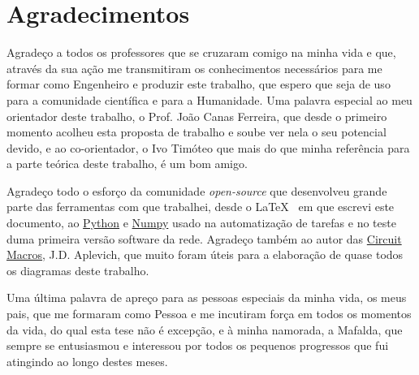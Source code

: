 \chapter*{Agradecimentos}

Agradeço a todos os professores que se cruzaram comigo na minha vida e que, através da sua ação
me transmitiram os conhecimentos necessários para me formar como Engenheiro e produzir este trabalho,
que espero que seja de uso para a comunidade científica e para a Humanidade. Uma palavra especial
ao meu orientador deste trabalho, o Prof. João Canas Ferreira, que desde o primeiro momento acolheu
esta proposta de trabalho e soube ver nela o seu potencial devido, e ao co-orientador, o Ivo Timóteo
que mais do que minha referência para a parte teórica deste trabalho, é um bom amigo.

Agradeço todo o esforço da comunidade \textit{open-source} que desenvolveu grande parte das ferramentas
com que trabalhei, desde o \LaTeX~ em que escrevi este documento, ao \href{https://www.python.org/}{Python} e \href{http://www.numpy.org/}{Numpy}
usado na automatização de tarefas e no teste duma primeira versão software da rede. Agradeço também ao autor das \href{https://ece.uwaterloo.ca/~aplevich/Circuit_macros/}{Circuit Macros},
J.D. Aplevich, que muito foram úteis para a elaboração de quase todos os diagramas deste trabalho.

Uma última palavra de apreço para as pessoas especiais da minha vida, os meus pais, que me formaram como Pessoa e me
incutiram força em todos os momentos da vida, do qual esta tese não é excepção, e à minha namorada, a Mafalda, que sempre 
se entusiasmou e interessou por todos os pequenos progressos que fui atingindo ao longo destes meses.

\vspace{10mm}

